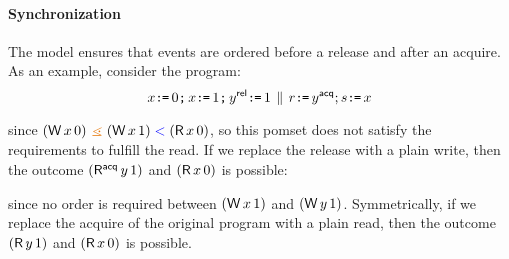 \paragraph{Synchronization}
The model ensures that events are ordered before a release and after an
acquire.  As an example, consider the program:
\begin{displaymath}
  x\GETS0\SEMI %
  x\GETS 1\SEMI y \REL\GETS1 \PAR r\GETS y\ACQ; s\GETS x
\end{displaymath}
  \hfill
\begin{tikzinline}[node distance=1em]
\end{tikzinline}
\hfill{}\hfill
\begin{tikzinline}[node distance=1em, baseline={([yshift=-1.5ex]current bounding box.west)}]
\end{tikzinline}
\hfill\hbox{}

\smallskip
\noindent
since $(\DW x0) \gtN (\DW x1) \lt (\DR x0)$, so this pomset does not satisfy the
requirements to fulfill the read.
If we replace the release
with a plain write, then the outcome $(\DRAcq y1)$ and $(\DR x0)$ is possible:
\begin{tikzdisplay}[node distance=1em]
\end{tikzdisplay}
since no order is required between $(\DW x1)$ and $(\DW y1)$.  
Symmetrically, if we replace the acquire of the original program
with a plain read, then the outcome $(\DR y1)$ and $(\DR x0)$ is possible.


